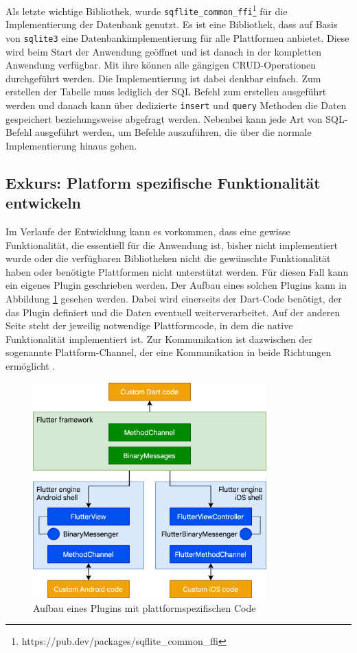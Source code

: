 Als letzte wichtige Bibliothek, wurde \verb|sqflite_common_ffi|\footnote{https://pub.dev/packages/sqflite\_common\_ffi} für die Implementierung der Datenbank genutzt. Es ist eine Bibliothek, dass auf Basis von \verb|sqlite3| eine Datenbankimplementierung für alle Plattformen anbietet.
Diese wird beim Start der Anwendung geöffnet und ist danach in der kompletten Anwendung verfügbar.
 Mit ihre können alle gängigen \ac{CRUD}-Operationen durchgeführt werden. Die Implementierung ist dabei denkbar einfach.
Zum erstellen der Tabelle muss lediglich der SQL Befehl zum erstellen ausgeführt werden und danach kann über dedizierte \verb|insert| und \verb|query| Methoden die Daten gespeichert beziehungsweise abgefragt werden.
Nebenbei kann jede Art von SQL-Befehl ausgeführt werden, um Befehle auszuführen, die über die normale Implementierung hinaus gehen.


\subsection{Exkurs: Platform spezifische Funktionalität entwickeln}
Im Verlaufe der Entwicklung kann es vorkommen, dass eine gewisse Funktionalität, die essentiell für die Anwendung ist, bisher nicht implementiert wurde oder die verfügbaren Bibliotheken nicht die gewünschte Funktionalität haben oder benötigte Plattformen nicht unterstützt werden. Für diesen Fall kann ein eigenes Plugin geschrieben werden. Der Aufbau eines solchen Plugins kann in Abbildung \ref{fig:flutter_plattform_specific} gesehen werden. Dabei wird einerseits der Dart-Code benötigt, der das Plugin definiert und die Daten eventuell weiterverarbeitet. Auf der anderen Seite steht der jeweilig notwendige Plattformcode, in dem die native Funktionalität implementiert ist. Zur Kommunikation ist dazwischen der sogenannte Plattform-Channel, der eine Kommunikation in beide Richtungen ermöglicht \cite[Kapitel~12.3]{Flutter_Recipes}.

\begin{figure}[ht]
  \centering
  \includegraphics[width=9cm,keepaspectratio]{images/flutter-platform-channels.png} 
  \caption[Aufbau eines Plugins mit plattformspezifischen Code]{Aufbau eines Plugins mit plattformspezifischen Code\protect\footnotemark}
  \label{fig:flutter_plattform_specific}
\end{figure}

